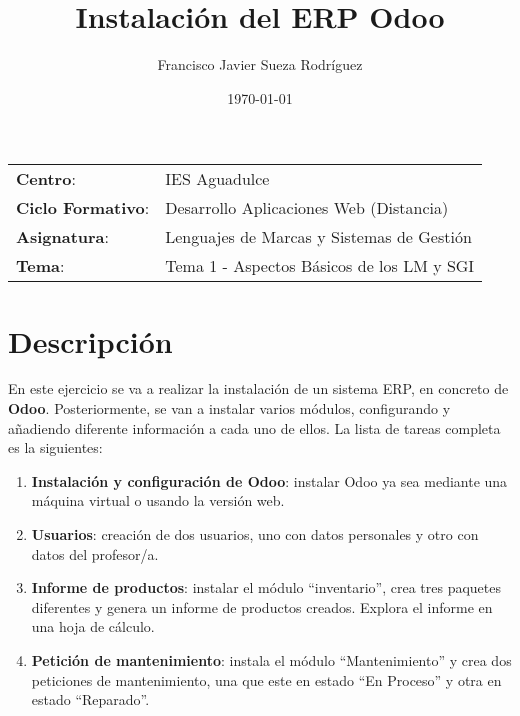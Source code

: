 


\title{
\normalfont \normalsize
\huge \textbf{Instalación del ERP Odoo}
}

\author{Francisco Javier Sueza Rodríguez}
\date{\normalsize\today}



\maketitle

\begin{center}
    \begin{tabular}{l l}
        \textbf{Centro}: & IES Aguadulce \\
        \textbf{Ciclo Formativo}: & Desarrollo Aplicaciones Web (Distancia)\\
        \textbf{Asignatura}: & Lenguajes de Marcas y Sistemas de Gestión \\
        \textbf{Tema}: & Tema 1 - Aspectos Básicos de los LM y SGI \\
    \end{tabular}
\end{center}

\vspace{10ex}

\section{Descripción}
En este ejercicio se va a realizar la instalación de un sistema ERP, en concreto de \textbf{Odoo}. Posteriormente, se van a instalar varios módulos, configurando y añadiendo diferente información a cada uno de ellos. La lista de tareas completa es la siguientes:

\begin{enumerate}
    \item \textbf{Instalación y configuración de Odoo}: instalar Odoo ya sea mediante una máquina virtual o usando la versión web.
    \item \textbf{Usuarios}: creación de dos usuarios, uno con datos personales y otro con datos del profesor/a.
    \item \textbf{Informe de productos}: instalar el módulo ``inventario'', crea tres paquetes diferentes y genera un informe de productos creados. Explora el informe en una hoja de cálculo.
    \item \textbf{Petición de mantenimiento}: instala el módulo ``Mantenimiento'' y crea dos peticiones de mantenimiento, una que este en estado ``En Proceso'' y otra en estado ``Reparado''.
\end{enumerate}

